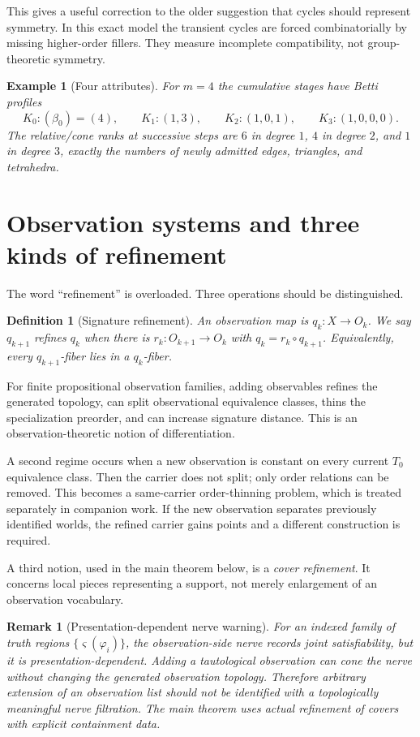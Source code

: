 \documentclass[11pt]{article}
\newtheorem{definition}[theorem]{Definition}
\newtheorem{example}[theorem]{Example}
\newtheorem{remark}[theorem]{Remark}
\begin{document}
This gives a useful correction to the older suggestion that cycles should represent symmetry.  In this exact model the transient cycles are forced combinatorially by missing higher-order fillers.  They measure incomplete compatibility, not group-theoretic symmetry.

\begin{example}[Four attributes]
For $m=4$ the cumulative stages have Betti profiles
\[
K_0:(\beta_0)=(4),\qquad
K_1:(1,3),\qquad
K_2:(1,0,1),\qquad
K_3:(1,0,0,0).
\]
The relative/cone ranks at successive steps are $6$ in degree $1$, $4$ in degree $2$, and $1$ in degree $3$, exactly the numbers of newly admitted edges, triangles, and tetrahedra.
\end{example}

\section{Observation systems and three kinds of refinement}

The word ``refinement'' is overloaded.  Three operations should be distinguished.

\begin{definition}[Signature refinement]
An observation map is $q_k:X\to O_k$.  We say $q_{k+1}$ refines $q_k$ when there is $r_k:O_{k+1}\to O_k$ with $q_k=r_k\circ q_{k+1}$.  Equivalently, every $q_{k+1}$-fiber lies in a $q_k$-fiber.
\end{definition}

For finite propositional observation families, adding observables refines the generated topology, can split observational equivalence classes, thins the specialization preorder, and can increase signature distance.  This is an observation-theoretic notion of differentiation.

A second regime occurs when a new observation is constant on every current $T_0$ equivalence class.  Then the carrier does not split; only order relations can be removed.  This becomes a same-carrier order-thinning problem, which is treated separately in companion work.  If the new observation separates previously identified worlds, the refined carrier gains points and a different construction is required.

A third notion, used in the main theorem below, is a \emph{cover refinement}.  It concerns local pieces representing a support, not merely enlargement of an observation vocabulary.

\begin{remark}[Presentation-dependent nerve warning]
For an indexed family of truth regions $\{\varsigma(\varphi_i)\}$, the observation-side nerve records joint satisfiability, but it is presentation-dependent.  Adding a tautological observation can cone the nerve without changing the generated observation topology.  Therefore arbitrary extension of an observation list should not be identified with a topologically meaningful nerve filtration.  The main theorem uses actual refinement of covers with explicit containment data.
\end{remark}
\end{document}
